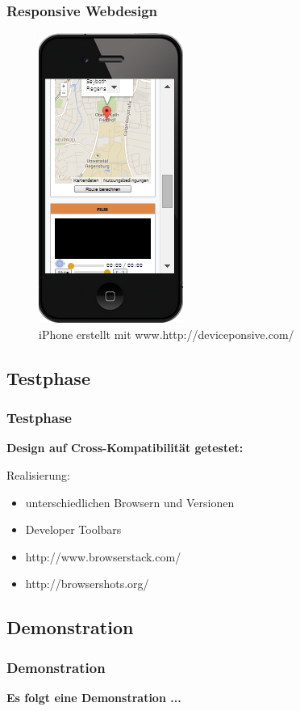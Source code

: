 \begin{frame}
  \frametitle{Responsive Webdesign}
\begin{figure}[!htbp]
 \centering
 \includegraphics[scale=0.5]{./Source/Iphone2.png}
 \caption{iPhone erstellt mit www.http://deviceponsive.com/}

\end{figure}
\end{frame}

\subsection{Testphase}
\begin{frame} %
\frametitle{Testphase} %
  \textbf{Design auf Cross-Kompatibilität getestet: }
  \begin{block}{Realisierung:}
	 \begin{itemize}

	\item unterschiedlichen Browsern und Versionen
	\item Developer Toolbars
	\item http://www.browserstack.com/
	\item http://browsershots.org/
 \end{itemize}
\end{block}


\end{frame}







\subsection{Demonstration}
\begin{frame} %
  \frametitle{Demonstration} %

  \center
  \textbf{Es folgt eine Demonstration ...}
\end{frame}